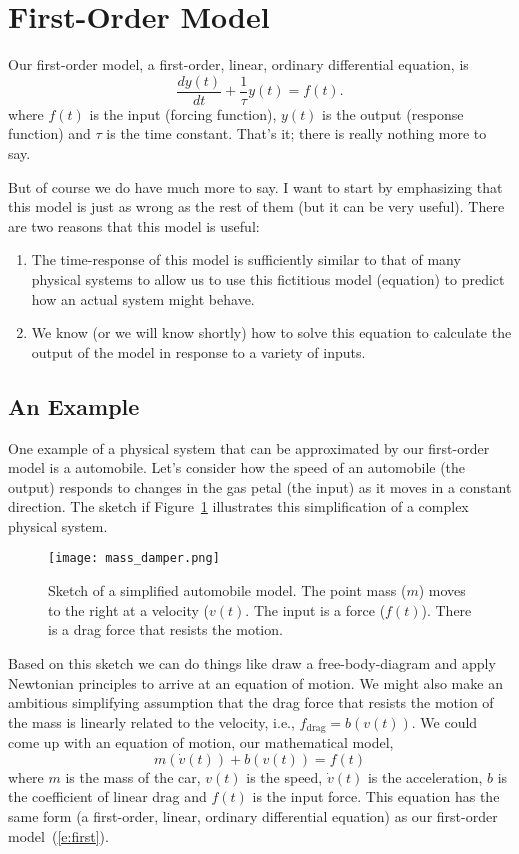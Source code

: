 \section{First-Order Model}
Our \gls{first-order model}, a first-order, linear, ordinary differential equation, is 
\begin{equation}
\label{e:first}
\frac{dy(t)}{dt} + \frac{1}{\tau}y(t) = f(t).
\end{equation}
where $f(t)$ is the input (forcing function), $y(t)$ is the output (response function) and $\tau$ is the time constant.  That's it; there is really nothing more to say.  

But of course we do have much more to say.  I want to start by emphasizing that this model is just as wrong as the rest of them (but it can be very useful).  There are two reasons that this model is useful:
\begin{enumerate}
\item The time-response of this model is sufficiently similar to that of many physical systems to allow us to use this fictitious model (equation) to predict how an actual system might behave.
\item We know (or we will know shortly) how to solve this equation to calculate the output of the model in response to a variety of inputs.
\end{enumerate}

\subsection{An Example}
One example of a physical system that can be approximated by our first-order model is a automobile.  Let's consider how the speed of an automobile (the output) responds to changes in the gas petal (the input) as it moves in a constant direction.  The sketch if Figure~\ref{f:massd} illustrates this simplification of a complex physical system. 
\begin{figure}[hbt!]
\centering
\texttt{[image: mass\_damper.png]}
\caption{Sketch of a simplified automobile model.  The point mass ($m$) moves to the right at a velocity ($v(t)$.  The input is a force ($f(t)$).  There is a drag force that resists the motion. }
\label{f:massd}
\end{figure}
Based on this sketch we can do things like draw a free-body-diagram and apply Newtonian principles to arrive at an equation of motion.  We might also make an ambitious simplifying assumption that the drag force that resists the motion of the mass is linearly related to the velocity, i.e., $f_{\mathrm{drag}}=b(v(t))$.  We could come up with an equation of motion, our mathematical model,
\begin{equation}
\label{e:car}
m\left(\dot{v}(t)\right) + b(v(t)) = f(t)
\end{equation}
where $m$ is the mass of the car, $v(t)$ is the speed, $\dot{v}(t)$ is the acceleration, $b$ is the coefficient of linear drag and $f(t)$ is the input force.
This equation has the same form (a first-order, linear, ordinary differential equation) as our first-order model~(\ref{e:first}).

